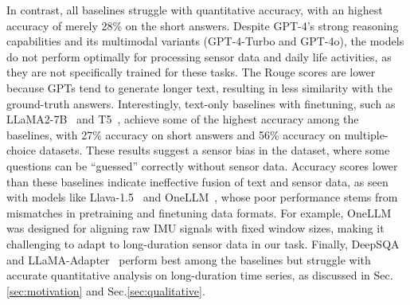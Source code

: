

In contrast, all baselines struggle with quantitative accuracy, with an highest accuracy of merely 28\% on the short answers.
Despite GPT-4's strong reasoning capabilities and its multimodal variants (GPT-4-Turbo and GPT-4o), the models do not perform optimally for processing sensor data and daily life activities, as they are not specifically trained for these tasks.
The Rouge scores are lower because GPTs tend to generate longer text, resulting in less similarity with the ground-truth answers.
Interestingly, text-only baselines with finetuning, such as LLaMA2-7B~\cite{touvron2023llama} and T5~\cite{2020t5}, achieve some of the highest accuracy among the baselines, with 27\% accuracy on short answers and 56\% accuracy on multiple-choice datasets. These results suggest a sensor bias in the dataset, where some questions can be ``guessed'' correctly without sensor data.
Accuracy scores lower than these baselines indicate ineffective fusion of text and sensor data, as seen with models like Llava-1.5~\cite{liu2024improved} and OneLLM~\cite{han2024onellm}, whose poor performance stems from mismatches in pretraining and finetuning data formats. For example, OneLLM was designed for aligning raw IMU signals with fixed window sizes, making it challenging to adapt to long-duration sensor data in our task. Finally, DeepSQA~\cite{xing2021deepsqa} and LLaMA-Adapter~\cite{zhang2023llama} perform best among the baselines but struggle with accurate quantitative analysis on long-duration time series, as discussed in Sec.\ref{sec:motivation} and Sec.\ref{sec:qualitative}.



